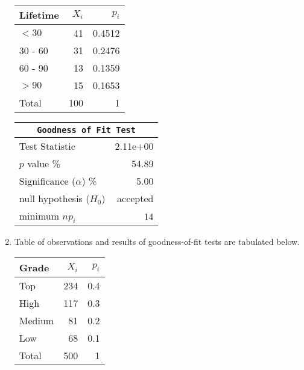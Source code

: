 \begin{enumerate}
	\begin{table}[H]
		\centering
		\begin{minipage}{0.4\textwidth}
			\centering
			\begin{tabular}{@{}lrr@{}}
				\toprule
				Lifetime & $X_i$ &   $p_i$ \\
				\midrule
				$ <30 $   &    41 &  0.4512 \\
				30 - 60 &    31 &  0.2476 \\
				60 - 90 &    13 &  0.1359 \\
				$ >90  $  &    15 &  0.1653 \\
				\midrule
				Total &   100 &       1 \\
				\bottomrule
			\end{tabular}
			
		\end{minipage}
		\begin{minipage}{0.4\textwidth}
			\centering
			\begin{tabular}{@{}lr@{}}
				\toprule
				\multicolumn{2}{c}{\texttt{Goodness of Fit Test}} \\
				\midrule
				Test Statistic             &  2.11e+00 \\
				$p$ value \%               &     54.89 \\
				Significance ($\alpha$) \% &      5.00 \\
				null hypothesis ($H_0$)    &  accepted \\
				minimum $n p_i$            &        14 \\
				\bottomrule
			\end{tabular}
			
		\end{minipage}
	\end{table}
	\bigskip
	
	\item Table of observations and results of goodness-of-fit tests are tabulated below.\\
	
	\begin{table}[H]
		\centering
		\begin{minipage}{0.4\textwidth}
			\centering
			\begin{tabular}{@{}lrr@{}}
				\toprule
				Grade & $X_i$ & $p_i$ \\
				\midrule
				Top    &   234 &   0.4 \\
				High   &   117 &   0.3 \\
				Medium &    81 &   0.2 \\
				Low    &    68 &   0.1 \\
				\midrule
				Total  &   500 &     1 \\
				\bottomrule
			\end{tabular}
			

\end{minipage}
\end{table}
\end{enumerate}
